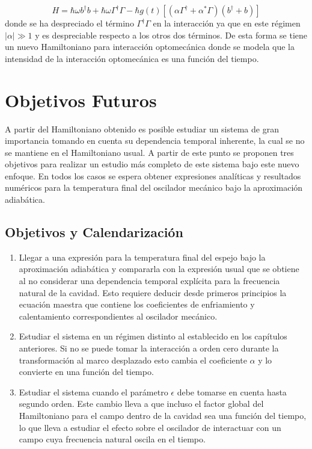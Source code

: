 \documentclass[10pt,a4paper]{report}
\begin{document}
\begin{equation}
H = \hbar \omega b^\dagger b + \hbar\omega \Gamma^\dagger \Gamma -\hbar g(t)[( \alpha \Gamma^{\dagger} + \alpha^* \Gamma)(b^{\dagger}+b)]
\end{equation} donde se ha despreciado el término $\Gamma^{\dagger}\Gamma$ en la interacción ya que en este régimen $|\alpha| \gg 1$ y es despreciable respecto a los otros dos términos. De esta forma se tiene un nuevo Hamiltoniano para interacción optomecánica donde se modela que la intensidad de la interacción optomecánica es una función del tiempo.

\chapter{Objetivos Futuros}


A partir del Hamiltoniano obtenido es posible estudiar un sistema de gran importancia tomando en cuenta su dependencia temporal inherente, la cual se no se mantiene en el Hamiltoniano usual\cite{CavesIF}. A partir de este punto se proponen tres objetivos para realizar un estudio más completo de este sistema bajo este nuevo enfoque. En todos los casos se espera obtener expresiones analíticas y resultados numéricos  para la temperatura final del oscilador mecánico bajo la aproximación adiabática.

\section{Objetivos y Calendarización}

\begin{enumerate}
\item Llegar a una expresión para la temperatura final del espejo bajo la aproximación adiabática y compararla con la expresión usual que se obtiene al no considerar una dependencia temporal explícita para la frecuencia natural de la cavidad. Esto requiere deducir desde primeros principios la ecuación maestra que contiene los coeficientes de enfriamiento y calentamiento correspondientes al oscilador mecánico.

\item Estudiar el sistema en un régimen distinto al establecido en los capítulos anteriores. Si no se puede tomar la interacción a orden cero durante la transformación al marco desplazado esto cambia el coeficiente $\alpha$ y lo convierte en una función del tiempo.

\item Estudiar el sistema cuando el parámetro $\epsilon$ debe tomarse en cuenta hasta segundo orden. Este cambio lleva a que incluso el factor global del Hamiltoniano para el campo dentro de la cavidad sea una función del tiempo, lo que lleva a estudiar el efecto sobre el oscilador de interactuar con un campo cuya frecuencia natural oscila en el tiempo. 
\end{enumerate}
\end{document}
